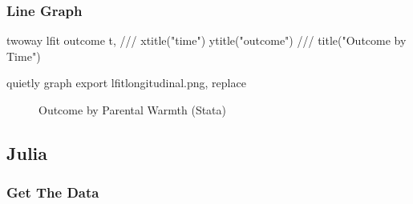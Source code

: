 \documentclass[
  letterpaper,
  DIV=11,
  numbers=noendperiod]{scrreprt}
\newenvironment{Shaded}{\begin{snugshade}}{\end{snugshade}}
\newcommand{\BaseNTok}[1]{\textcolor[rgb]{0.68,0.00,0.00}{#1}}
\newcommand{\CommentTok}[1]{\textcolor[rgb]{0.37,0.37,0.37}{#1}}
\newcommand{\KeywordTok}[1]{\textcolor[rgb]{0.00,0.23,0.31}{#1}}
\newcommand{\NormalTok}[1]{\textcolor[rgb]{0.00,0.23,0.31}{#1}}
\newcommand{\StringTok}[1]{\textcolor[rgb]{0.13,0.47,0.30}{#1}}
\begin{document}
\subsubsection{Line Graph}\label{line-graph-2}

\begin{Shaded}
\begin{Highlighting}[]
\KeywordTok{twoway} \KeywordTok{lfit}\NormalTok{ outcome t, }\CommentTok{///}
  \BaseNTok{xtitle}\NormalTok{(}\StringTok{"time"}\NormalTok{) }\BaseNTok{ytitle}\NormalTok{(}\StringTok{"outcome"}\NormalTok{) }\CommentTok{///}
  \BaseNTok{title}\NormalTok{(}\StringTok{"Outcome by Time"}\NormalTok{) }

\KeywordTok{quietly} \KeywordTok{graph} \KeywordTok{export}\NormalTok{ lfitlongitudinal.png, }\KeywordTok{replace}
\end{Highlighting}
\end{Shaded}

\begin{figure}


\caption{\label{fig-Statalongitudinal}Outcome by Parental Warmth
(Stata)}

\end{figure}%

\subsection{Julia}

\subsubsection{Get The Data}\label{get-the-data-5}
\end{document}
